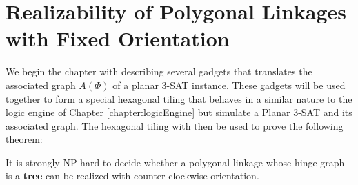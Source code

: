 \chapter{Realizability of Polygonal Linkages with Fixed Orientation\label{chapter:polygonalLinkage}}

We begin the chapter with describing several gadgets that translates the associated graph $A(\Phi)$ of a planar 3-SAT instance.  
These gadgets will be used together to form a special hexagonal tiling that behaves in a similar nature to the logic engine of Chapter \ref{chapter:logicEngine} but simulate a Planar 3-SAT and its associated graph.
The hexagonal tiling with then be used to prove the following theorem:
\begin{thm}\label{thm:hinge2}
It is strongly NP-hard to decide whether a polygonal linkage whose hinge graph is a \textbf{tree} can be realized with counter-clockwise orientation.
\end{thm}


